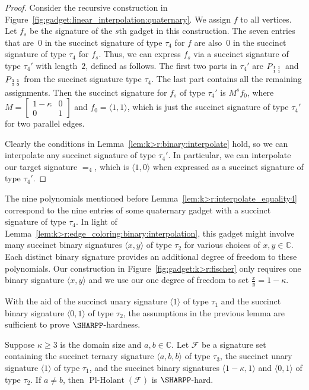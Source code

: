 \documentclass[11pt]{article}
\newcommand{\PlHolant}{\operatorname{Pl-Holant}}
\newcommand{\subMat}[4]{\mbox{\scriptsize $\begin{smallmatrix} #1 & #4 \\ #2 & #3 \end{smallmatrix}$}}
\newenvironment{remark}{\medskip{\bfseries \noindent Remark:}}{\par\medskip}{\par\medskip}
\begin{document}
\begin{proof}
 Consider the recursive construction in Figure~\ref{fig:gadget:linear_interpolation:quaternary}.
 We assign $f$ to all vertices.
 Let $f_s$ be the signature of the $s$th gadget in this construction.
 The seven entries that are~$0$ in the succinct signature of type $\tau_4$ for $f$ are also~$0$ in the succinct signature of type $\tau_4$ for $f_s$.
 Thus, we can express $f_s$ via a succinct signature of type $\tau_4'$ with length~$2$, defined as follows.
 The first two parts in $\tau_4'$ are $P_{\subMat{1}{1}{1}{1}}$
 and $P_{\subMat{1}{2}{2}{1}}$ from the succinct signature type $\tau_4$.
 The last part contains all the remaining assignments.
 Then the succinct signature for $f_s$ of type $\tau_4'$ is $M^s f_0$,
 where $M = \left[\begin{smallmatrix} 1-\kappa & 0 \\ 0 & 1 \end{smallmatrix}\right]$ and $f_0 = \langle 1,1 \rangle$,
 which is just the succinct signature of type $\tau_4'$ for two parallel edges.
 
 Clearly the conditions in Lemma~\ref{lem:k>r:binary:interpolate} hold,
 so we can interpolate any succinct signature of type $\tau_4'$.
 In particular,
 we can interpolate our target signature $=_4$,
 which is $\langle 1,0 \rangle$ when expressed as a succinct signature of type $\tau_4'$.
\end{proof}

\begin{remark}
 The nine polynomials mentioned before Lemma~\ref{lem:k>r:interpolate_equality4}
 correspond to the nine entries of some quaternary gadget with a succinct signature of type $\tau_4$.
 In light of Lemma~\ref{lem:k>r:edge_coloring:binary:interpolation},
 this gadget might involve many succinct binary signatures $\langle x,y \rangle$ of type $\tau_2$ for various choices of $x,y \in \mathbb{C}$.
 Each distinct binary signature provides an additional degree of freedom to these polynomials.
 Our construction in Figure~\ref{fig:gadget:k>r:fischer} only requires one binary signature $\langle x,y \rangle$
 and we use our one degree of freedom to set $\frac{x}{y} = 1 - \kappa$.
\end{remark}

With the aid of the succinct unary signature $\langle 1 \rangle$ of type $\tau_1$
and the succinct binary signature $\langle 0,1 \rangle$ of type $\tau_2$,
the assumptions in the previous lemma are sufficient to prove $\SHARPP$-hardness.

\begin{corollary} \label{cor:k>r:abb_unary_binaries}
 Suppose $\kappa \ge 3$ is the domain size and $a,b \in \mathbb{C}$.
 Let $\mathcal{F}$ be a signature set containing the succinct ternary signature $\langle a, b, b \rangle$ of type $\tau_3$,
 the succinct unary signature $\langle 1 \rangle$ of type $\tau_1$,
 and the succinct binary signatures $\langle 1 - \kappa, 1 \rangle$ and $\langle 0,1 \rangle$ of type $\tau_2$.
 If $a \ne b$,
 then $\PlHolant(\mathcal{F})$ is $\SHARPP$-hard.
\end{corollary}
\end{document}
